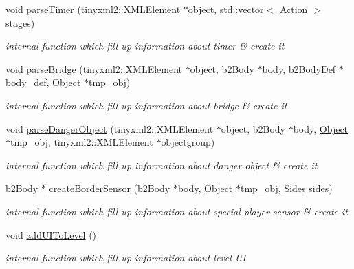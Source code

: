 \begin{DoxyCompactItemize}
void \hyperlink{class_level_a0230969dca0cd75ab48e212c3ec559ce}{parse\+Timer} (tinyxml2\+::\+X\+M\+L\+Element $\ast$object, std\+::vector$<$ \hyperlink{_manual_switch_obj_8h_a8bb1ef53467e4f61410d12822d922498}{Action} $>$ stages)
\begin{DoxyCompactList}\small\item\em internal function which fill up information about timer \& create it \end{DoxyCompactList}\item 
void \hyperlink{class_level_aa1921baab6b1d686f68d81efd235ebc4}{parse\+Bridge} (tinyxml2\+::\+X\+M\+L\+Element $\ast$object, b2\+Body $\ast$body, b2\+Body\+Def $\ast$body\+\_\+def, \hyperlink{class_object}{Object} $\ast$tmp\+\_\+obj)
\begin{DoxyCompactList}\small\item\em internal function which fill up information about bridge \& create it \end{DoxyCompactList}\item 
void \hyperlink{class_level_a4e4b69194e33200fff8f9b0282e10559}{parse\+Danger\+Object} (tinyxml2\+::\+X\+M\+L\+Element $\ast$object, b2\+Body $\ast$body, \hyperlink{class_object}{Object} $\ast$tmp\+\_\+obj, tinyxml2\+::\+X\+M\+L\+Element $\ast$objectgroup)
\begin{DoxyCompactList}\small\item\em internal function which fill up information about danger object \& create it \end{DoxyCompactList}\item 
b2\+Body $\ast$ \hyperlink{class_level_a87d0a007fafb7f51a1410f6f7114b699}{create\+Border\+Sensor} (b2\+Body $\ast$body, \hyperlink{class_object}{Object} $\ast$tmp\+\_\+obj, \hyperlink{_level_8h_aa8656d997df416abfebfcf4b3041f01c}{Sides} sides)
\begin{DoxyCompactList}\small\item\em internal function which fill up information about special player sensor \& create it \end{DoxyCompactList}\item 
\mbox{\label{class_level_a9977ee08d7036b23eb0467a6d8d2e176}} 
void \hyperlink{class_level_a9977ee08d7036b23eb0467a6d8d2e176}{add\+U\+I\+To\+Level} ()
\begin{DoxyCompactList}\small\item\em internal function which fill up information about level UI \end{DoxyCompactList}\item 

\end{DoxyCompactItemize}
